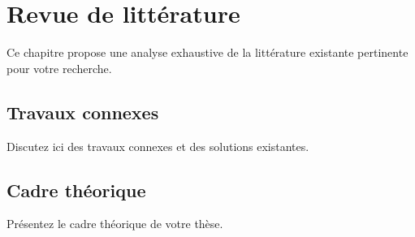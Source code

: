 \chapter{Revue de littérature}
\label{ch:literature}

Ce chapitre propose une analyse exhaustive de la littérature existante pertinente pour votre recherche.

\section{Travaux connexes}

Discutez ici des travaux connexes et des solutions existantes.

\section{Cadre théorique}

Présentez le cadre théorique de votre thèse.

